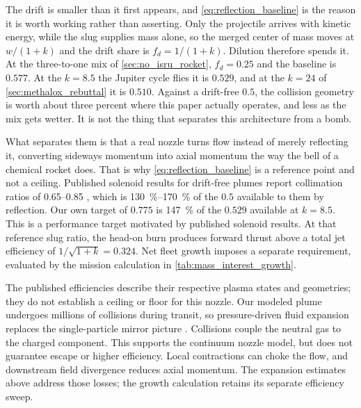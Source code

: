 \documentclass{article}
\begin{document}
The drift is smaller than it first appears, and \autoref{eq:reflection_baseline} is the reason it is worth working rather than asserting. Only the projectile arrives with kinetic energy, while the slug supplies mass alone, so the merged center of mass moves at $w/(1+k)$ and the drift share is $f_d = 1/(1+k)$. Dilution therefore spends it. At the three-to-one mix of \autoref{sec:no_isru_rocket}, $f_d = 0.25$ and the baseline is $0.577$. At the $k = 8.5$ the Jupiter cycle flies it is $0.529$, and at the $k = 24$ of \autoref{sec:methalox_rebuttal} it is $0.510$. Against a drift-free $0.5$, the collision geometry is worth about three percent where this paper actually operates, and less as the mix gets wetter. It is not the thing that separates this architecture from a bomb.

What separates them is that a real nozzle turns flow instead of merely reflecting it, converting sideways momentum into axial momentum the way the bell of a chemical rocket does. That is why \autoref{eq:reflection_baseline} is a reference point and not a ceiling. Published solenoid results for drift-free plumes report collimation ratios of \numrange{0.65}{0.85} \cite{schilling2022nozzle,hyde1983laserfusion_rocket}, which is \SIrange{130}{170}{\percent} of the $0.5$ available to them by reflection. Our own target of $0.775$ is \SI{147}{\percent} of the $0.529$ available at $k = 8.5$. This is a performance target motivated by published solenoid results. At that reference slug ratio, the head-on burn produces forward thrust above a total jet efficiency of $1/\sqrt{1+k} = 0.324$. Net fleet growth imposes a separate requirement, evaluated by the mission calculation in \autoref{tab:mass_interest_growth}.

The published efficiencies describe their respective plasma states and geometries; they do not establish a ceiling or floor for this nozzle. Our modeled plume undergoes millions of collisions during transit, so pressure-driven fluid expansion replaces the single-particle mirror picture \cite{Katz_puffsat_impact_sim_2026}. Collisions couple the neutral gas to the charged component. This supports the continuum nozzle model, but does not guarantee escape or higher efficiency. Local contractions can choke the flow, and downstream field divergence reduces axial momentum. The expansion estimates above address those losses; the growth calculation retains its separate efficiency sweep.
\end{document}
